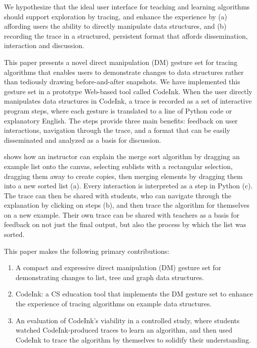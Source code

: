 We hypothesize that the ideal user interface for teaching and learning
algorithms should support exploration by tracing, and enhance the experience by
(a) affording users the ability to directly manipulate data structures, and
(b) recording the trace in a structured, persistent format that affords
dissemination, interaction and discussion.

This paper presents a novel direct manipulation (DM) gesture set for tracing
algorithms that enables users to demonstrate changes to data structures rather
than tediously drawing before-and-after snapshots. We have implemented this
gesture set in a prototype Web-based tool called CodeInk. When the user directly
manipulates data structures in CodeInk, a trace is recorded as a set of
interactive program steps, where each gesture is translated to a line of Python
code or explanatory English. The steps provide three main benefits: feedback on
user interactions, navigation through the trace, and a format that can be easily
disseminated and analyzed as a basis for discussion.

 shows how an instructor can explain the merge
sort algorithm by dragging an example list onto the canvas, selecting
sublists with a rectangular selection, dragging them away to create
copies, then merging elements by dragging them into a new sorted list
(a). Every interaction is interpreted as a step
in Python (c). The trace can then be shared with
students, who can navigate through the explanation by clicking on steps
(b), and then trace the algorithm for themselves
on a new example. Their own trace can be shared with teachers as a basis
for feedback on not just the final output, but also the process by which
the list was sorted.

This paper makes the following primary contributions:

\begin{enumerate} %

\item A compact and expressive direct manipulation (DM) gesture set for
demonstrating changes to list, tree and graph data structures.

\item CodeInk: a CS education tool that implements the DM gesture set to
enhance the experience of tracing algorithms on example data structures.

\item An evaluation of CodeInk's viability in a controlled study, where
students watched CodeInk-produced traces to learn an algorithm, and then
used CodeInk to trace the algorithm by themselves to solidify their
understanding.

\end{enumerate}

